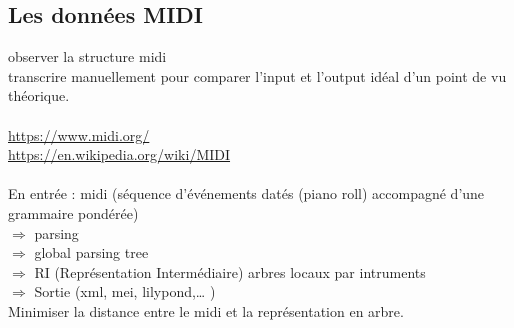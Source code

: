 \subsection{Les données MIDI}
observer la structure midi\\
transcrire manuellement pour comparer l’input et l’output idéal d’un point de vu théorique.\\\\
\url{https://www.midi.org/}\\
\url{https://en.wikipedia.org/wiki/MIDI}\\\\
En entrée : midi (séquence d’événements datés (piano roll) accompagné d’une grammaire pondérée)\\
$\Rightarrow$ parsing\\
$\Rightarrow$ global parsing tree\\
$\Rightarrow$ RI (Représentation Intermédiaire) arbres locaux par intruments\\
$\Rightarrow$ Sortie (xml, mei, lilypond,… )\\
Minimiser la distance entre le midi et la représentation en arbre.\\\\